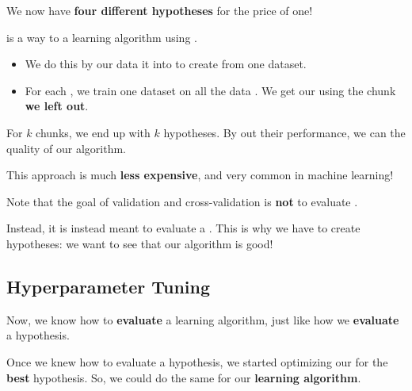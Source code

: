         We now have \textbf{four different hypotheses} for the price of one!\\
        
        \begin{definition}
             is a way to  a learning algorithm using .

            \begin{itemize}
                \item We do this by  our data it into  to create  from one dataset.
                
                \item For each , we train one dataset on all the data . We get our  using the chunk \textbf{we left out}.
            \end{itemize}
            
            For $k$ chunks, we end up with $k$ hypotheses. By  out their performance, we can  the quality of our algorithm.
        \end{definition}
        
        This approach is much \textbf{less expensive}, and very common in machine learning! 
            \\
        
        \begin{clarification}
            Note that the goal of validation and cross-validation is \textbf{not} to evaluate .
            
            Instead, it is instead meant to evaluate a . This is why we have to create  hypotheses: we want to see that our algorithm is  good!
        \end{clarification}
        
    \subsection{Hyperparameter Tuning}
    
        Now, we know how to \textbf{evaluate} a learning algorithm, just like how we \textbf{evaluate} a hypothesis. 
        
        Once we knew how to evaluate a hypothesis, we started optimizing our  for the \textbf{best} hypothesis. So, we could do the same for our \textbf{learning algorithm}.

